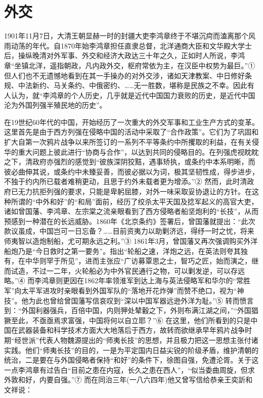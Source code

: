\documentclass[10pt,a4paper]{beamer} %
\begin{document}
	\section{外交}
	\begin{frame}
		1901年11月7日，大清王朝显赫一时的封疆大吏李鸿章终于不堪沉疴而溘离那个风雨动荡的年代。自1870年始李鸿章担任直隶总督，北洋通商大臣和文华殿大学士后，操纵晚清对外军事、外交和经济大政达三十年之久，正如时人所说，李鸿章“坐镇北洋，遥指朝政，凡内政外交，枢府常依为主，在汉臣中权势为最巨。”①但人们也不无遗憾地看到在其一手操办的对外交涉，诸如天津教案、中日修好条规、中法新约、马关条约、中俄密约、……无一胜数，堪称是民族之不幸。因此有人认为，就“李鸿章的个人历史，几乎就是近代中国国力衰败的历史，是近代中国沦为外国列强半殖民地的历史”。
	\end{frame}
	\begin{frame}
		在19世纪60年代的中国，开始经历了一次重大的外交军事和工业生产方式的变革。这里首先是由于西方列强在侵略中国的活动中采取了“合作政策”。它们为了巩固和扩大自第一次鸦片战争以来所签订的一系列不平等条约中所攫取的利益，在有关侵华的重大问题上彼此进行“协商与合作”，以达到共同的侵略目的。在列强虎视眈眈之下，清政府亦强烈的感觉到“彼族深阴狡黠，遇事矫执，或条约中本系明晰，而彼必曲伸其说，或条约中未臻妥善，而彼必据以为词，极其坚韧性成，得步进步，不独于约内所已载者难稍更动，且思于约外未载者更为增添。”② 然而，此时清政府已无力抗拒列强的要求，只能是卑躬屈膝，对外一味采取妥协退让的方针。在这种所谓的“中外和好”的“和局”面前，经历了绞杀太平天国及捻军起义的高官大吏，诸如曾国藩、李鸿章、左宗棠之流亲眼看到了西方侵略者船坚炮利的“长技”，从而预感到一种潜在的长远威胁。1860年《北京条约》签署后，曾国藩就提出：“此次款议虽成，中国岂可一日忘备？……目前资夷力以助剿济远，得纾一时之忧，将来师夷智以造炮制船，尤可期永远之利。”③ 1861年3月，曾国藩又再次强调购买外洋船炮乃是“今日救时之第一要务”。指出“轮船之速，洋炮之远，在英法则夸其独有，在中华则罕于所见”，进而主张应“广访募覃思之士，智巧之匠，始而演之，继而试造，不过一二年，火轮船必为中外官民通行之物，可以剿发逆，可以存远略。”④ 而李鸿章则更因在1862年率领淮军到达上海与英法侵略军和华尔的“常胜军”向太平军进攻时亲眼看到外国军队的“落地开花炸弹”而赞不绝口，视为“神技”。他为此也曾给曾国藩写信哀叹到“深以中国军器远逊外洋为耻。”⑤ 转而愤言到：“外国利器强兵，百倍中国，内则狎处辇轂之下，外则布满江湖之间，”“外国猖獗至此，不亟亟焉求富强，中国将何以自立耶？”⑥ 在这里，他们所看到的只是中国在武器装备和科学技术方面大大地落后于西方，故转而欲继承早年鸦片战争时期“经世派”代表人物魏源提出的“师夷长技”的思想，并且极力把这一思想主张付诸实践。他们“师夷长技”的目的，一是为平定国内日益尖锐的阶级矛盾，维护清朝的统治，二是要在与外国侵略者保持“和好”的条件下，徐图自强，免遭沦胥。关于这一点李鸿章有过告白“目前之患在内寇，长久之患在西人”，“似当委曲周旋，但求外敦和好，内要自强。”⑦ 而在同治三年(一八六四年)他又曾写信给恭亲王奕訢和文祥说：
	\end{frame}
\end{document}
